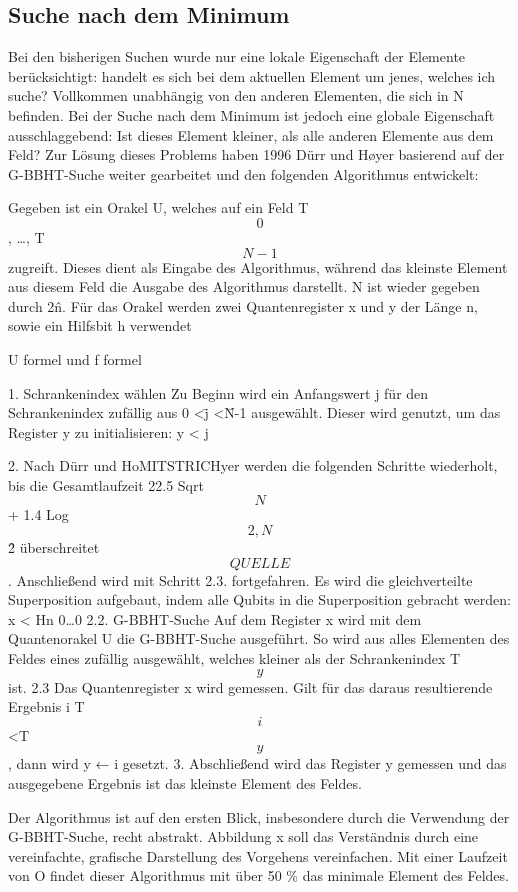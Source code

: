\subsection{Suche nach dem Minimum}
Bei den bisherigen Suchen wurde nur eine lokale Eigenschaft der Elemente berücksichtigt: handelt es sich bei dem aktuellen Element um jenes, welches ich suche? Vollkommen unabhängig von den anderen Elementen, die sich in N befinden. Bei der Suche nach dem Minimum ist jedoch eine globale Eigenschaft ausschlaggebend: Ist dieses Element kleiner, als alle anderen Elemente aus dem Feld? 
Zur Lösung dieses Problems haben 1996 Dürr und Høyer basierend auf der G-BBHT-Suche weiter gearbeitet und den folgenden Algorithmus entwickelt: 

Gegeben ist ein Orakel U, welches auf ein Feld T\[0\], …, T\[N-1\] zugreift. Dieses dient als Eingabe des Algorithmus, während das kleinste Element aus diesem Feld die Ausgabe des Algorithmus darstellt. N ist wieder gegeben durch 2\^n. Für das Orakel werden zwei Quantenregister x\> und y\> der Länge n, sowie ein Hilfsbit h\> verwendet\:

U formel und f formel

1. Schrankenindex wählen
Zu Beginn wird ein Anfangswert j für den Schrankenindex zufällig aus 0 <\= j <\= N-1 ausgewählt. Dieser wird genutzt, um das Register y\> zu initialisieren: y\> <\- j\>

2. Nach Dürr und HoMITSTRICHyer werden die folgenden Schritte wiederholt, bis die Gesamtlaufzeit 22.5 Sqrt\[N\] + 1.4 Log\[2,N\]\^2 überschreitet \[QUELLE\]. Anschließend wird mit Schritt 2.3. fortgefahren. Es wird die gleichverteilte Superposition aufgebaut, indem alle Qubits in die Superposition gebracht werden:
x\> <\- Hn 0…0  
2.2. G-BBHT-Suche
Auf dem Register x\> wird mit dem Quantenorakel U die G-BBHT-Suche ausgeführt. So wird aus alles Elementen des Feldes eines zufällig ausgewählt, welches kleiner als der Schrankenindex T\[y\] ist.
2.3 Das Quantenregister x\> wird gemessen. Gilt für das daraus resultierende Ergebnis i T\[i\]<T\[y\], dann wird y\> ← i\>  gesetzt.
3. Abschließend wird das Register y\> gemessen und das ausgegebene Ergebnis ist das kleinste Element des Feldes.

Der Algorithmus ist auf den ersten Blick, insbesondere durch die Verwendung der G-BBHT-Suche, recht abstrakt. Abbildung x soll das Verständnis  durch eine vereinfachte, grafische Darstellung des Vorgehens vereinfachen. Mit einer Laufzeit von O findet dieser Algorithmus mit über 50 \% das minimale Element des Feldes.
